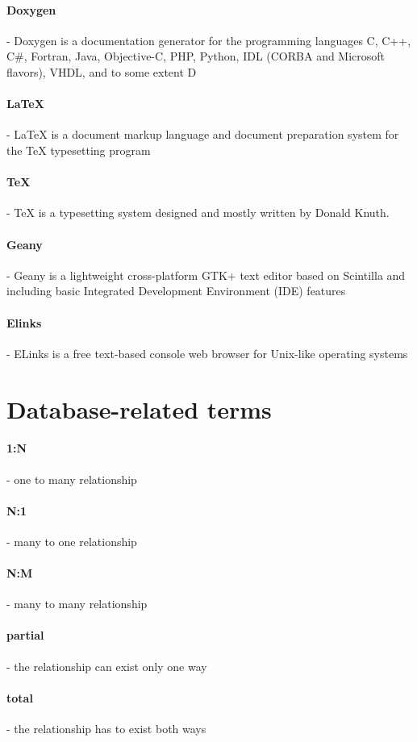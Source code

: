 \paragraph{Doxygen} - Doxygen is a documentation generator for the programming languages C, C++, C\#, Fortran, Java, Objective-C, PHP, Python, IDL (CORBA and Microsoft flavors), VHDL, and to some extent D
\paragraph{\LaTeX} - LaTeX is a document markup language and document preparation system for the TeX typesetting program
\paragraph{\TeX} -  TeX is a typesetting system designed and mostly written by Donald Knuth.
\paragraph{Geany} - Geany is a lightweight cross-platform GTK+ text editor based on Scintilla and including basic Integrated Development Environment (IDE) features
\paragraph{Elinks} - ELinks is a free text-based console web browser for Unix-like operating systems

\section{Database-related terms}
\paragraph{1:N}- one to many relationship
\paragraph{N:1}- many to one relationship
\paragraph{N:M}- many to many relationship
\paragraph{partial}- the relationship can exist only one way
\paragraph{total}- the relationship has to exist both ways